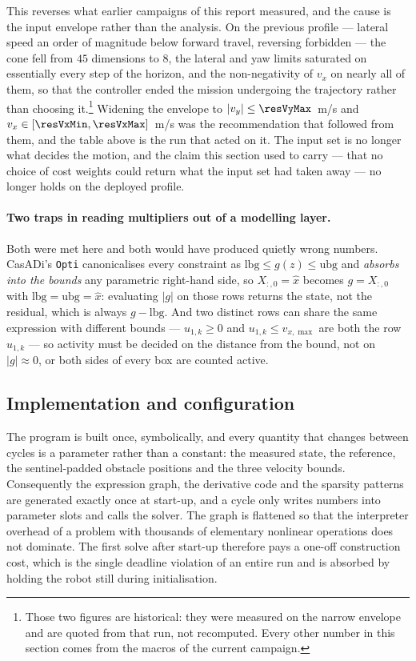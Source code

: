 \documentclass[11pt,a4paper]{article}
\begin{document}
This reverses what earlier campaigns of this report measured, and the cause is the input envelope rather
than the analysis. On the previous profile --- lateral speed an order of magnitude below forward travel,
reversing forbidden --- the cone fell from $45$ dimensions to $8$, the lateral and yaw limits saturated on
essentially every step of the horizon, and the non-negativity of $v_x$ on nearly all of them, so that the
controller ended the mission undergoing the trajectory rather than choosing it.\footnote{Those two figures
are historical: they were measured on the narrow envelope and are quoted from that run, not recomputed.
Every other number in this section comes from the macros of the current campaign.} Widening the envelope to
$|v_y|\le\resVyMax$~m/s and $v_x\in[\resVxMin,\resVxMax]$~m/s was the recommendation that followed from
them, and the table above is the run that acted on it. The input set is no longer what decides the motion,
and the claim this section used to carry --- that no choice of cost weights could return what the input set
had taken away --- no longer holds on the deployed profile.

\paragraph{Two traps in reading multipliers out of a modelling layer.} Both were met here and both would have
produced quietly wrong numbers. CasADi's \texttt{Opti} canonicalises every constraint as
$\mathrm{lbg}\le g(z)\le\mathrm{ubg}$ and \emph{absorbs into the bounds} any parametric right-hand side, so
$X_{:,0}=\hat x$ becomes $g=X_{:,0}$ with $\mathrm{lbg}=\mathrm{ubg}=\hat x$: evaluating $|g|$ on those rows
returns the state, not the residual, which is always $g-\mathrm{lbg}$. And two distinct rows can share the
same expression with different bounds --- $u_{1,k}\ge0$ and $u_{1,k}\le v_{x,\max}$ are both the row
$u_{1,k}$ --- so activity must be decided on the distance from the bound, not on $|g|\approx0$, or both sides
of every box are counted active.

\subsection{Implementation and configuration}
\label{sec:impl}

The program is built once, symbolically, and every quantity that changes between cycles is a parameter rather
than a constant: the measured state, the reference, the sentinel-padded obstacle positions and the three
velocity bounds. Consequently the expression graph, the derivative code and the sparsity patterns are
generated exactly once at start-up, and a cycle only writes numbers into parameter slots and calls the
solver. The graph is flattened so that the interpreter overhead of a problem with thousands of elementary
nonlinear operations does not dominate. The first solve after start-up therefore pays a one-off construction
cost, which is the single deadline violation of an entire run and is absorbed by holding the robot still
during initialisation.
\end{document}
